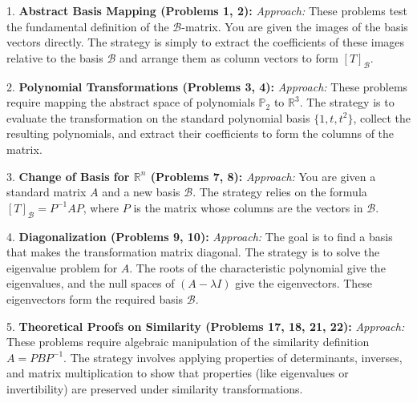 \documentclass[11pt, a4paper]{article}
\theoremstyle{definition}
\theoremstyle{remark}
\newcommand{\R}{\mathbb{R}}
\begin{document}
1. \textbf{Abstract Basis Mapping (Problems 1, 2):}
   \textit{Approach:} These problems test the fundamental definition of the $\mathcal{B}$-matrix. You are given the images of the basis vectors directly. The strategy is simply to extract the coefficients of these images relative to the basis $\mathcal{B}$ and arrange them as column vectors to form $[T]_\mathcal{B}$.

2. \textbf{Polynomial Transformations (Problems 3, 4):}
   \textit{Approach:} These problems require mapping the abstract space of polynomials $\mathbb{P}_2$ to $\R^3$. The strategy is to evaluate the transformation on the standard polynomial basis $\{1, t, t^2\}$, collect the resulting polynomials, and extract their coefficients to form the columns of the matrix.

3. \textbf{Change of Basis for $\R^n$ (Problems 7, 8):}
   \textit{Approach:} You are given a standard matrix $A$ and a new basis $\mathcal{B}$. The strategy relies on the formula $[T]_\mathcal{B} = P^{-1}AP$, where $P$ is the matrix whose columns are the vectors in $\mathcal{B}$.

4. \textbf{Diagonalization (Problems 9, 10):}
   \textit{Approach:} The goal is to find a basis that makes the transformation matrix diagonal. The strategy is to solve the eigenvalue problem for $A$. The roots of the characteristic polynomial give the eigenvalues, and the null spaces of $(A - \lambda I)$ give the eigenvectors. These eigenvectors form the required basis $\mathcal{B}$.

5. \textbf{Theoretical Proofs on Similarity (Problems 17, 18, 21, 22):}
   \textit{Approach:} These problems require algebraic manipulation of the similarity definition $A = PBP^{-1}$. The strategy involves applying properties of determinants, inverses, and matrix multiplication to show that properties (like eigenvalues or invertibility) are preserved under similarity transformations.
\end{document}
